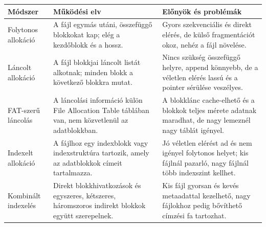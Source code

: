 \begin{tabularx}{\textwidth}{L{28mm}X X}
\toprule
\textbf{Módszer} & \textbf{Működési elv} & \textbf{Előnyök és problémák} \\
\midrule
Folytonos allokáció & A fájl egymás utáni, összefüggő blokkokat kap; elég a kezdőblokk és a hossz. & Gyors szekvenciális és direkt elérés, de külső fragmentációt okoz, nehéz a fájl növelése. \\
Láncolt allokáció & A fájl blokkjai láncolt listát alkotnak; minden blokk a következő blokkra mutat. & Nincs szükség összefüggő helyre, append könnyebb, de a véletlen elérés lassú és a pointer sérülése veszélyes. \\
FAT-szerű láncolás & A láncolási információ külön File Allocation Table táblában van, nem közvetlenül az adatblokkban. & A blokklánc cache-elhető és a blokkok teljes mérete adatnak maradhat, de nagy lemeznél nagy táblát igényel. \\
Indexelt allokáció & A fájlhoz egy indexblokk vagy indexstruktúra tartozik, amely az adatblokkok címeit tartalmazza. & Jó véletlen elérést ad és nem igényel folytonos helyet; kis fájlnál pazarló, nagy fájlnál több indexszint kellhet. \\
Kombinált indexelés & Direkt blokkhivatkozások és egyszeres, kétszeres, háromszoros indirekt blokkok együtt szerepelnek. & Kis fájl gyorsan és kevés metaadattal kezelhető, nagy fájlokhoz pedig bővíthető címzési fa tartozhat. \\
\bottomrule
\end{tabularx}
